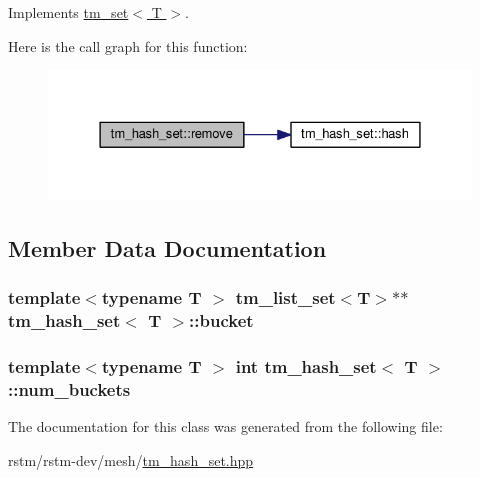 Implements \hyperlink{classtm__set_a45a928f648e51c4ea1c181db71efadf0}{tm\-\_\-set$<$ T $>$}.



Here is the call graph for this function\-:
\nopagebreak
\begin{figure}[H]
\begin{center}
\leavevmode
\includegraphics[width=328pt]{classtm__hash__set_a1509ba92e7be69a82bb43d2198119b08_cgraph}
\end{center}
\end{figure}




\subsection{Member Data Documentation}
\hypertarget{classtm__hash__set_a636e29c090577e85953d1a45dc353567}{
\subsubsection[{bucket}]{\setlength{\rightskip}{0pt plus 5cm}template$<$typename T $>$ {\bf tm\-\_\-list\-\_\-set}$<$T$>$$\ast$$\ast$ {\bf tm\-\_\-hash\-\_\-set}$<$ T $>$\-::bucket\hspace{0.3cm}{\ttfamily [private]}}}\label{classtm__hash__set_a636e29c090577e85953d1a45dc353567}
\hypertarget{classtm__hash__set_a5cd1ca63b5defd3cae98ec2a3ff7f521}{
\subsubsection[{num\-\_\-buckets}]{\setlength{\rightskip}{0pt plus 5cm}template$<$typename T $>$ int {\bf tm\-\_\-hash\-\_\-set}$<$ T $>$\-::num\-\_\-buckets\hspace{0.3cm}{\ttfamily [private]}}}\label{classtm__hash__set_a5cd1ca63b5defd3cae98ec2a3ff7f521}


The documentation for this class was generated from the following file\-:\begin{DoxyCompactItemize}
\item 
rstm/rstm-\/dev/mesh/\hyperlink{tm__hash__set_8hpp}{tm\-\_\-hash\-\_\-set.\-hpp}\end{DoxyCompactItemize}
